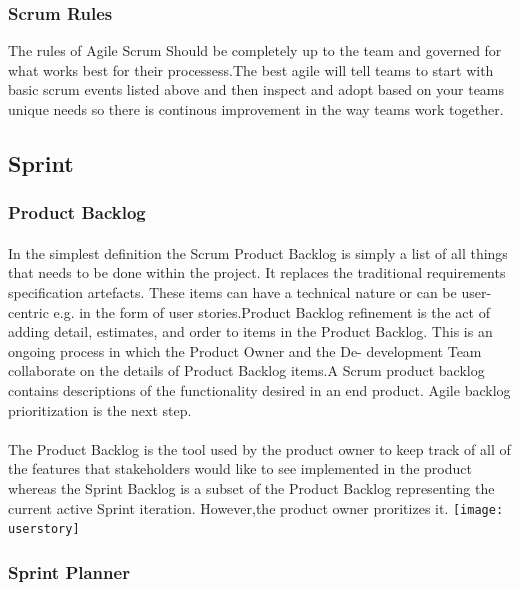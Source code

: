 \documentclass[a4paper, 12pt]{report}
\begin{document}
\subsubsection{Scrum Rules}
The rules of Agile Scrum Should be completely up to the team and governed for what works best for their processess.The best agile will tell teams to start with basic scrum events listed above and then inspect and adopt based on your teams unique needs so there is continous improvement in the way teams work together.

\subsection{Sprint}
\fontsize{12pt}{12pt}\selectfont
\subsubsection{Product Backlog}
\fontsize{12pt}{12pt}\selectfont
\paragraph{}
In the simplest deﬁnition the Scrum Product Backlog is simply a list of all things that needs to be done within the project. It replaces the traditional requirements speciﬁcation artefacts. These items can have a technical nature or can be user-centric e.g. in the form of user stories.Product Backlog reﬁnement is the act of adding detail, estimates, and order to items in the Product Backlog. This is an ongoing process in which the Product Owner and the De- development Team collaborate on the details of Product Backlog items.A Scrum product backlog contains descriptions of the functionality desired in an end product. Agile backlog prioritization is the next step.
\paragraph{}
The Product Backlog is the tool used by the product owner to keep track of all of the features that stakeholders would like to see implemented in the product whereas the Sprint Backlog is a subset of the Product Backlog representing the current active Sprint iteration.
However,the product owner proritizes it.
\linebreak
\texttt{[image: userstory]} 
\subsubsection{Sprint Planner}
\fontsize{12pt}{12pt}\selectfont
\end{document}
